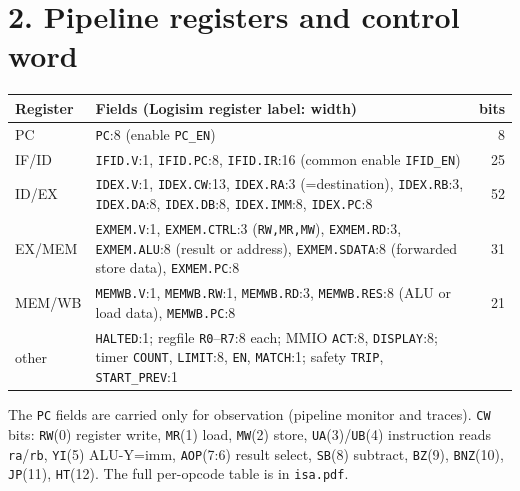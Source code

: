 \documentclass[10pt,a4paper]{article}
\begin{document}
\section*{2. Pipeline registers and control word}
\begin{center}
\scriptsize\renewcommand{\arraystretch}{1.12}
\begin{tabular}{|l|p{11.6cm}|r|}
\hline\rowcolor{black!8}
\textbf{Register} & \textbf{Fields (Logisim register label: width)} & \textbf{bits}\\ \hline
PC & \texttt{PC}:8 (enable \texttt{PC\_EN}) & 8\\ \hline
IF/ID & \texttt{IFID.V}:1, \texttt{IFID.PC}:8, \texttt{IFID.IR}:16 (common enable \texttt{IFID\_EN}) & 25\\ \hline
ID/EX & \texttt{IDEX.V}:1, \texttt{IDEX.CW}:13, \texttt{IDEX.RA}:3 (=destination), \texttt{IDEX.RB}:3, \texttt{IDEX.DA}:8, \texttt{IDEX.DB}:8,
  \texttt{IDEX.IMM}:8, \texttt{IDEX.PC}:8 & 52\\ \hline
EX/MEM & \texttt{EXMEM.V}:1, \texttt{EXMEM.CTRL}:3 (\texttt{RW,MR,MW}), \texttt{EXMEM.RD}:3, \texttt{EXMEM.ALU}:8 (result or address),
  \texttt{EXMEM.SDATA}:8 (forwarded store data), \texttt{EXMEM.PC}:8 & 31\\ \hline
MEM/WB & \texttt{MEMWB.V}:1, \texttt{MEMWB.RW}:1, \texttt{MEMWB.RD}:3, \texttt{MEMWB.RES}:8 (ALU or load data), \texttt{MEMWB.PC}:8 & 21\\ \hline
other & \texttt{HALTED}:1; regfile \texttt{R0}--\texttt{R7}:8 each; MMIO \texttt{ACT}:8, \texttt{DISPLAY}:8; timer \texttt{COUNT}, \texttt{LIMIT}:8,
  \texttt{EN}, \texttt{MATCH}:1; safety \texttt{TRIP}, \texttt{START\_PREV}:1 & \\ \hline
\end{tabular}
\end{center}
The \texttt{PC} fields are carried only for observation (pipeline monitor and traces). \texttt{CW} bits:
\texttt{RW}(0) register write, \texttt{MR}(1) load, \texttt{MW}(2) store, \texttt{UA}(3)/\texttt{UB}(4) instruction reads
\texttt{ra}/\texttt{rb}, \texttt{YI}(5) ALU-Y=imm, \texttt{AOP}(7:6) result select, \texttt{SB}(8) subtract, \texttt{BZ}(9),
\texttt{BNZ}(10), \texttt{JP}(11), \texttt{HT}(12). The full per-opcode table is in \texttt{isa.pdf}.
\end{document}
